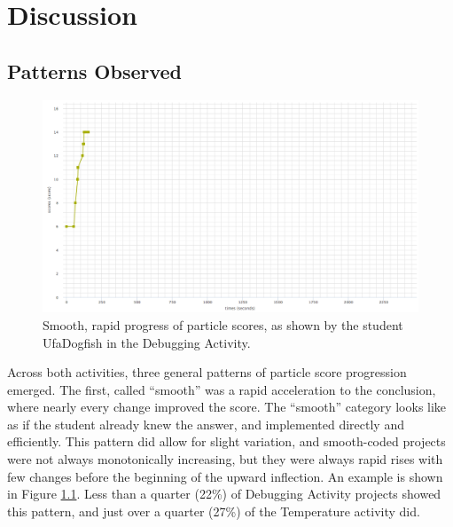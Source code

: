 \chapter{Discussion}
\label{ch:discussion}


\section{Patterns Observed}
\label{sec:patterns}

\begin{figure}
	\centering
	\includegraphics[width=\textwidth]{images/stories/scores-debug-UfaDogfish}
	\caption[Smooth, Rapid Progress of Particle Scores]{Smooth, rapid progress of particle scores, as shown by the student UfaDogfish in the Debugging Activity.}
	\label{fig:smooth_chart}
\end{figure}
Across both activities, three general patterns of particle score progression emerged. The first, called ``smooth'' was a rapid acceleration to the conclusion, where nearly every change improved the score. The ``smooth'' category looks like as if the student already knew the answer, and implemented directly and efficiently. This pattern did allow for slight variation, and smooth-coded projects were not always monotonically increasing, but they were always rapid rises with few changes before the beginning of the upward inflection. An example is shown in Figure \ref{fig:smooth_chart}. Less than a quarter (22\%) of Debugging Activity projects showed this pattern, and just over a quarter (27\%) of the Temperature activity did.

